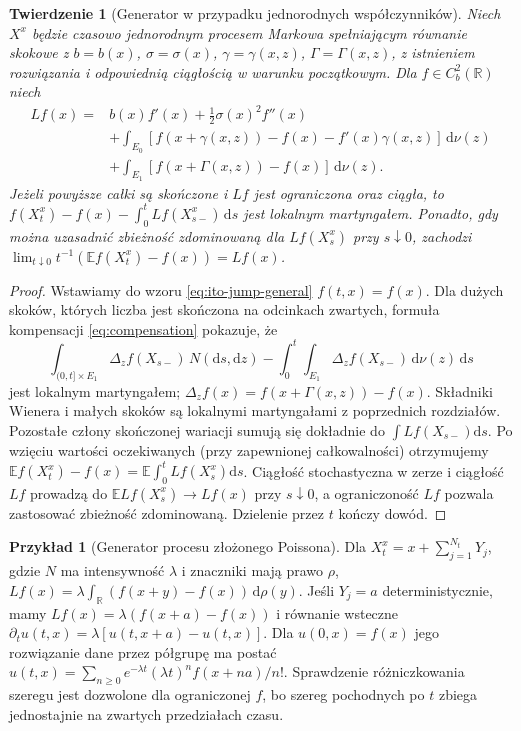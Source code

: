 \documentclass[11pt,a4paper,oneside]{report}
\numberwithin{equation}{chapter}
\theoremstyle{plain}
\newtheorem{twierdzenie}{Twierdzenie}[chapter]
\theoremstyle{definition}
\newtheorem{przyklad}{Przykład}[chapter]
\theoremstyle{remark}
\newcommand{\R}{\mathbb{R}}
\newcommand{\E}{\mathbb{E}}
\newcommand{\dd}{\mathrm{d}}
\begin{document}
\begin{twierdzenie}[Generator w przypadku jednorodnych współczynników]
\label{th:jump-generator}
Niech $X^x$ będzie czasowo jednorodnym procesem Markowa
spełniającym równanie skokowe
z $b=b(x)$, $\sigma=\sigma(x)$, $\gamma=\gamma(x,z)$,
$\Gamma=\Gamma(x,z)$, z istnieniem rozwiązania i
odpowiednią ciągłością w warunku początkowym.
Dla $f\in C_b^2(\R)$ niech
\[
\begin{split}
Lf(x)={}&b(x)f'(x)+\frac12\sigma(x)^2f''(x)\\
&+\int_{E_0}[f(x+\gamma(x,z))-f(x)-f'(x)\gamma(x,z)]\,\dd\nu(z)\\
&+\int_{E_1}[f(x+\Gamma(x,z))-f(x)]\,\dd\nu(z).
\end{split}
\tag{12.6}\label{eq:jump-generator}
\]
Jeżeli powyższe całki są skończone i $Lf$ jest
ograniczona oraz ciągła, to
$f(X_t^x)-f(x)-\int_0^tLf(X_{s-}^x)\,\dd s$
jest lokalnym martyngałem. Ponadto, gdy można
uzasadnić zbieżność zdominowaną dla $Lf(X_s^x)$ przy
$s\downarrow0$, zachodzi
$\lim_{t\downarrow0}t^{-1}(\E f(X_t^x)-f(x))=Lf(x)$.
\end{twierdzenie}
\begin{proof}
Wstawiamy do wzoru \eqref{eq:ito-jump-general}
$f(t,x)=f(x)$. Dla dużych skoków, których liczba jest
skończona na odcinkach zwartych, formuła kompensacji
\eqref{eq:compensation} pokazuje, że
\[
\int_{(0,t]\times E_1}\Delta_zf(X_{s-})\,N(\dd s,\dd z)
-\int_0^t\int_{E_1}\Delta_zf(X_{s-})\,\dd\nu(z)\,\dd s
\]
jest lokalnym martyngałem; $\Delta_zf(x)=f(x+\Gamma(x,z))-f(x)$.
Składniki Wienera i małych skoków są lokalnymi martyngałami
z poprzednich rozdziałów. Pozostałe człony skończonej
wariacji sumują się dokładnie do $\int Lf(X_{s-})\dd s$.
Po wzięciu wartości oczekiwanych (przy zapewnionej
całkowalności) otrzymujemy
$\E f(X_t^x)-f(x)=\E\int_0^tLf(X_s^x)\dd s$.
Ciągłość stochastyczna w zerze i ciągłość $Lf$ prowadzą
do $\E Lf(X_s^x)\to Lf(x)$ przy $s\downarrow0$,
a ograniczoność $Lf$ pozwala zastosować zbieżność
zdominowaną. Dzielenie przez $t$ kończy dowód.
\end{proof}

\begin{przyklad}[Generator procesu złożonego Poissona]
Dla $X_t^x=x+\sum_{j=1}^{N_t}Y_j$, gdzie
$N$ ma intensywność $\lambda$ i znaczniki mają prawo $\rho$,
$Lf(x)=\lambda\int_{\R}(f(x+y)-f(x))\,\dd\rho(y)$.
Jeśli $Y_j=a$ deterministycznie, mamy
$Lf(x)=\lambda(f(x+a)-f(x))$ i równanie wsteczne
$\partial_tu(t,x)=\lambda[u(t,x+a)-u(t,x)]$.
Dla $u(0,x)=f(x)$ jego rozwiązanie dane przez
półgrupę ma postać
$u(t,x)=\sum_{n\ge0}e^{-\lambda t}(\lambda t)^n f(x+na)/n!$.
Sprawdzenie różniczkowania szeregu jest dozwolone dla
ograniczonej $f$, bo szereg pochodnych po $t$ zbiega
jednostajnie na zwartych przedziałach czasu.
\end{przyklad}
\end{document}
